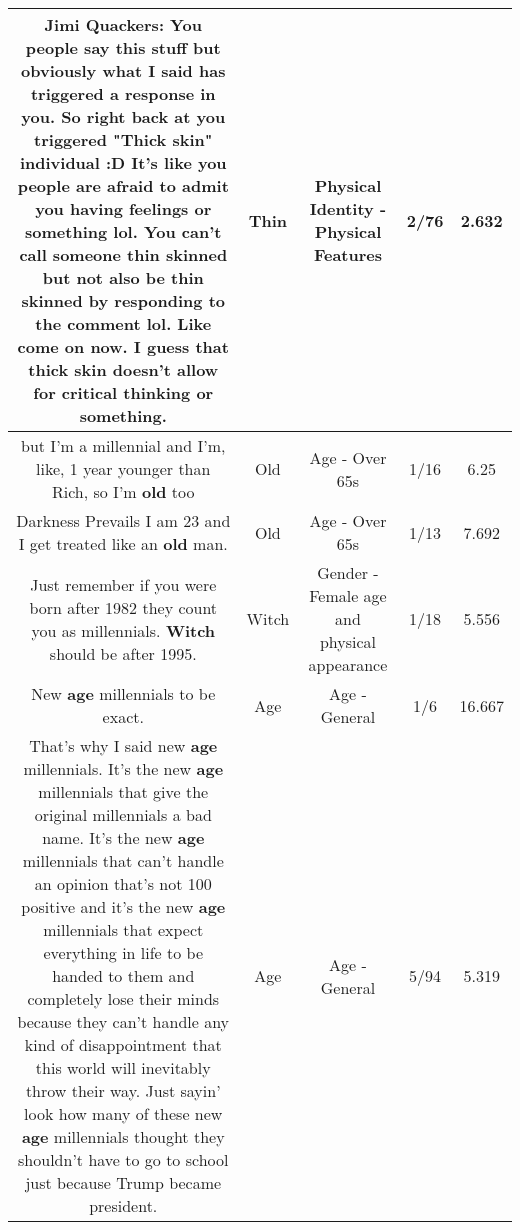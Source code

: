 \documentclass[11pt]{article}
\newlength\mylength
\begin{document}
\begin{center}
\begin{longtable}{|C{.65\mylength}|C{.30\mylength}|C{.12\mylength}|C{.12\mylength}|C{.12\mylength}|}
  \small Jimi Quackers: You people say this stuff but obviously what I said has triggered a response in you. So right back at you triggered "Thick skin" individual :D It's like you people are afraid to admit you having feelings or something lol. You can't call someone \textbf{thin} skinned but not also be \textbf{thin} skinned by responding to the comment lol. Like come on now. I guess that thick skin doesn't allow for critical thinking or something.\normalsize   & Thin & Physical Identity - Physical Features & 2/76 & 2.632 \\  \hline
  \small but I'm a millennial and I'm, like, 1 year younger than Rich, so I'm \textbf{old} too\normalsize   & Old & Age - Over 65s & 1/16 & 6.25 \\  \hline
  \small Darkness Prevails I am 23 and I get treated like an \textbf{old} man.\normalsize   & Old & Age - Over 65s & 1/13 & 7.692 \\  \hline
  \small Just remember if you were born after 1982 they count you as millennials. \textbf{Witch} should be after 1995.\normalsize   & Witch & Gender - Female age and physical appearance & 1/18 & 5.556 \\  \hline
  \small New \textbf{age} millennials to be exact.\normalsize   & Age & Age - General & 1/6 & 16.667 \\  \hline
  \small That's why I said new \textbf{age} millennials. It's the new \textbf{age} millennials that give the original millennials a bad name. It's the new \textbf{age} millennials that can't handle an opinion that's not 100 positive and it's the new \textbf{age} millennials that expect everything in life to be handed to them and completely lose their minds because they can't handle any kind of disappointment that this world will inevitably throw their way. Just sayin' look how many of these new \textbf{age} millennials thought they shouldn't have to go to school just because Trump became president.\normalsize   & Age & Age - General & 5/94 & 5.319 \\  \hline

\end{longtable}
\end{center}
\end{document}
